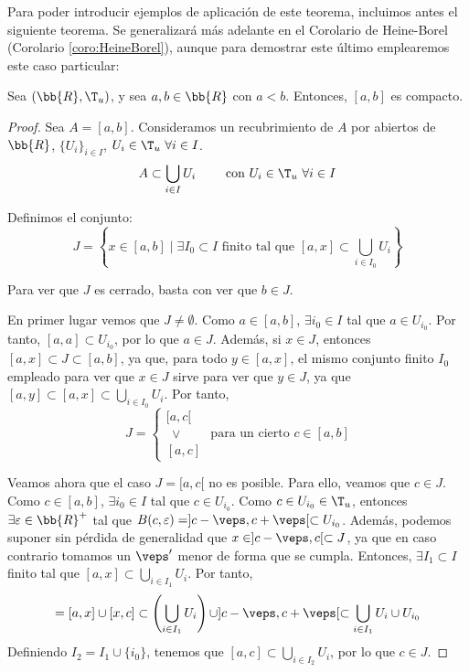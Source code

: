 Para poder introducir ejemplos de aplicación de este teorema, incluimos antes el siguiente teorema.
Se generalizará más adelante en el Corolario de Heine-Borel (Corolario \ref{coro:HeineBorel}), aunque para demostrar este último emplearemos este caso particular:
\begin{teo}\label{teo:IntervaloRCompacto}
    Sea $(\bb{R},\T_u)$, y sea $a,b\in \bb{R}$ con $a<b$. Entonces, $[a,b]$ es compacto.
\end{teo}
\begin{proof}
    Sea $A=[a,b]$. Consideramos un recubrimiento de $A$ por abiertos de $\bb{R}$, $\{U_i\}_{i\in I}$, $U_i\in \T_u~\forall i\in I$.
    \begin{equation*}
        A\subset \bigcup_{i\in I}U_i \qquad \text{ con } U_i\in \T_u~\forall i\in I
    \end{equation*}

    Definimos el conjunto:
    \begin{equation*}
        J = \left\{x\in [a,b]\mid \exists I_0\subset I \text{ finito tal que } [a,x]\subset \bigcup_{i\in I_0}U_i\right\}
    \end{equation*}

    Para ver que $J$ es cerrado, basta con ver que $b\in J$.

    En primer lugar vemos que $J\neq \emptyset$. Como $a\in [a,b]$, $\exists i_0\in I$ tal que $a\in U_{i_0}$. Por tanto, $[a,a]\subset U_{i_0}$, por lo que $a\in J$.
    Además, si $x\in J$, entonces $[a,x]\subset J\subset [a,b]$, ya que, para todo $y\in [a,x]$, el mismo conjunto finito $I_0$ empleado para ver que $x\in J$ sirve para ver que $y\in J$, ya que
    $[a,y]\subset[a,x]\subset \bigcup\limits_{i\in I_0}U_i$. Por tanto,
    \begin{equation*}
        J = \begin{cases}
            [a,c[ \\
            ~~\lor \\
            [a,c]
        \end{cases} \text{ para un cierto } c\in [a,b]
    \end{equation*}

    Veamos ahora que el caso $J=[a,c[$ no es posible. Para ello, veamos que $c\in J$. Como $c\in [a,b]$, $\exists i_0\in I$ tal que $c\in U_{i_0}$.
    Como $c\in U_{i_0}\in \T_u$, entonces $\exists \varepsilon\in \bb{R}^+$ tal que $B(c,\varepsilon)=]c-\veps,c+\veps[\subset U_{i_0}$.
    Además, podemos suponer sin pérdida de generalidad que $x\in ]c-\veps, c[\subset J$, ya que en caso contrario tomamos un $\veps'$ menor de forma que se cumpla.
    Entonces, $\exists I_1\subset I$ finito tal que $[a,x]\subset \bigcup\limits_{i\in I_1}U_i$. Por tanto,
    \begin{equation*}
        [a,c] = [a,x]\cup [x,c] \subset \left(\bigcup_{i\in I_1}U_i\right) \cup ]c-\veps,c+\veps[ \subset \bigcup_{i\in I_1}U_i \cup U_{i_0}
    \end{equation*}
    Definiendo $I_2=I_1\cup \{i_0\}$, tenemos que $[a,c]\subset \bigcup\limits_{i\in I_2}U_i$, por lo que $c\in J$.


\end{proof}
